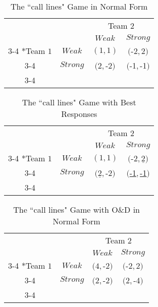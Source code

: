 \documentclass{article}
\begin{document}
  \begin{table}
\begin{center}
    \setlength{\extrarowheight}{2pt}
    \begin{tabular}{cc|c|c|}
      & \multicolumn{1}{c}{} & \multicolumn{2}{c}{Team $2$}\\
      & \multicolumn{1}{c}{} & \multicolumn{1}{c}{$Weak$}  & \multicolumn{1}{c}{$Strong$} \\\cline{3-4}
      \multirow{2}*{Team $1$}  & $Weak$ & $(1,1)$ & $($-2$,2)$ \\\cline{3-4}
      & $Strong$ & $(2,$-2$)$ & $($-1$,$-1$)$ \\\cline{3-4}
    \end{tabular}
\caption{The ``call lines" Game in Normal Form} 
\end{center}
  \end{table}

 \begin{table}
\begin{center}
    \setlength{\extrarowheight}{2pt}
    \begin{tabular}{cc|c|c|}
      & \multicolumn{1}{c}{} & \multicolumn{2}{c}{Team $2$}\\
      & \multicolumn{1}{c}{} & \multicolumn{1}{c}{$Weak$}  & \multicolumn{1}{c}{$Strong$} \\\cline{3-4}
      \multirow{2}*{Team $1$}  & $Weak$ & $(1,1)$ & $($-2$,\underline{2})$ \\\cline{3-4}
      & $Strong$ & $(\underline{2},$-2$)$ & $($\underline{-1}$,$\underline{-1}$)$ \\\cline{3-4}
    \end{tabular}
\caption{The ``call lines" Game with Best Responses} 
\end{center}
  \end{table}


  \begin{table}
\begin{center}
    \setlength{\extrarowheight}{2pt}
    \begin{tabular}{cc|c|c|}
      & \multicolumn{1}{c}{} & \multicolumn{2}{c}{Team $2$}\\
      & \multicolumn{1}{c}{} & \multicolumn{1}{c}{$Weak$}  & \multicolumn{1}{c}{$Strong$} \\\cline{3-4}
      \multirow{2}*{Team $1$}  & $Weak$ & $(4,$-2$)$ & $($-2$,2)$ \\\cline{3-4}
      & $Strong$ & $(2,$-2$)$ & $(2,$-4$)$ \\\cline{3-4}
    \end{tabular}
\caption{The ``call lines" Game with O\&D in Normal Form} 
\end{center}
  \end{table}
\end{document}

